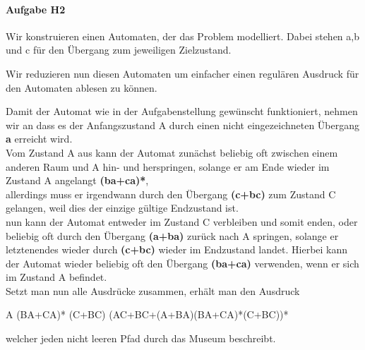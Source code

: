 \documentclass[11pt]{article}
\begin{document}
\paragraph{Aufgabe H2}
Wir konstruieren einen Automaten, der das Problem modelliert. Dabei stehen a,b und c für den Übergang zum jeweiligen Zielzustand.
\begin{center}
\end{center}
Wir reduzieren nun diesen Automaten um einfacher einen regulären Ausdruck für den Automaten ablesen zu können.

\begin{center}
\end{center}	
Damit der Automat wie in der Aufgabenstellung gewünscht funktioniert, nehmen wir an dass es der Anfangszustand A durch einen nicht eingezeichneten Übergang \textbf{a} erreicht wird.
\\Vom Zustand A aus kann der Automat zunächst beliebig oft zwischen einem anderen Raum und A hin- und herspringen, solange er am Ende wieder im Zustand A angelangt \textbf{(ba+ca)*},
\\allerdings muss er irgendwann durch den Übergang \textbf{(c+bc)} zum Zustand C gelangen, weil dies der einzige gültige Endzustand ist.
\\nun kann der Automat entweder im Zustand C verbleiben und somit enden, oder
\\beliebig oft durch den Übergang \textbf{(a+ba)} zurück nach A springen, solange er letztenendes wieder durch \textbf{(c+bc)} wieder im Endzustand landet. Hierbei kann der Automat wieder beliebig oft den Übergang \textbf{(ba+ca)} verwenden, wenn er sich im Zustand A befindet.
\\Setzt man nun alle Ausdrücke zusammen, erhält man den Ausdruck
\begin{center}
A (BA+CA)* (C+BC) (AC+BC+(A+BA)(BA+CA)*(C+BC))*
\end{center}
welcher jeden nicht leeren Pfad durch das Museum beschreibt.
\end{document}
